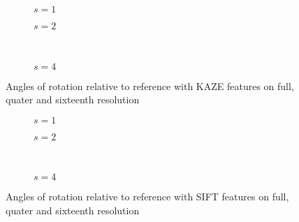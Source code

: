 \begin{figure}
   \begin{subfigure}{.5\linewidth}
      \centering      
      
      \label{fig:manor_KAZE_rotation_1}
      \caption{$s=1$}
   \end{subfigure}
   \quad
   \begin{subfigure}{.5\linewidth}
      \centering      
      
      \label{fig:manor_KAZE_rotation_2}
      \caption{$s=2$}
   \end{subfigure}\\[3ex]
   \begin{subfigure}{\linewidth}
      \centering      
      
      \label{fig:manor_KAZE_rotation_4}
      \caption{$s=4$}
   \end{subfigure}

   \caption{Angles of rotation relative to reference with
   KAZE features on full, quater and sixteenth resolution}
\end{figure}

\begin{figure}
   \begin{subfigure}{.5\linewidth}
      \centering      
      
      \label{fig:manor_SIFT_rotation_1}
      \caption{$s=1$}
   \end{subfigure}
   \quad
   \begin{subfigure}{.5\linewidth}
      \centering      
      
      \label{fig:manor_SIFT_rotation_2}
      \caption{$s=2$}
   \end{subfigure}\\[3ex]
   \begin{subfigure}{\linewidth}
      \centering      
      
      \label{fig:manor_SIFT_rotation_4}
      \caption{$s=4$}
   \end{subfigure}

   \caption{Angles of rotation relative to reference with
   SIFT features on full, quater and sixteenth resolution}
\end{figure}
